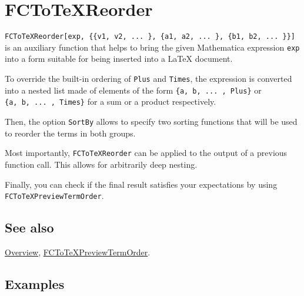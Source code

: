 \documentclass[../FeynCalcManual.tex]{subfiles}
\begin{document}
\hypertarget{fctotexreorder}{
\section{FCToTeXReorder}\label{fctotexreorder}}

\texttt{FCToTeXReorder[\allowbreak{}exp,\ \allowbreak{}\{\allowbreak{}\{\allowbreak{}v1,\ \allowbreak{}v2,\ \allowbreak{}... \},\ \allowbreak{}\{\allowbreak{}a1,\ \allowbreak{}a2,\ \allowbreak{}... \},\ \allowbreak{}\{\allowbreak{}b1,\ \allowbreak{}b2,\ \allowbreak{}... \}\}]}
is an auxiliary function that helps to bring the given Mathematica
expression \texttt{exp} into a form suitable for being inserted into a
LaTeX document.

To override the built-in ordering of \texttt{Plus} and \texttt{Times},
the expression is converted into a nested list made of elements of the
form
\texttt{\{\allowbreak{}a,\ \allowbreak{}b,\ \allowbreak{}... ,\ \allowbreak{}Plus\}}
or
\texttt{\{\allowbreak{}a,\ \allowbreak{}b,\ \allowbreak{}... ,\ \allowbreak{}Times\}}
for a sum or a product respectively.

Then, the option \texttt{SortBy} allows to specify two sorting functions
that will be used to reorder the terms in both groups.

Most importantly, \texttt{FCToTeXReorder} can be applied to the output
of a previous function call. This allows for arbitrarily deep nesting.

Finally, you can check if the final result satisfies your expectations
by using \texttt{FCToTeXPreviewTermOrder}.

\subsection{See also}

\hyperlink{toc}{Overview},
\hyperlink{fctotexpreviewtermorder}{FCToTeXPreviewTermOrder}.

\subsection{Examples}
\end{document}
